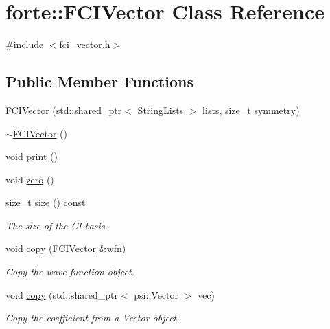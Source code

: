 \hypertarget{classforte_1_1_f_c_i_vector}{}\section{forte\+:\+:F\+C\+I\+Vector Class Reference}
\label{classforte_1_1_f_c_i_vector}


{\ttfamily \#include $<$fci\+\_\+vector.\+h$>$}

\subsection*{Public Member Functions}
\begin{DoxyCompactItemize}
\item 
\mbox{\hyperlink{classforte_1_1_f_c_i_vector_ac11c68d1754586cf203dad0b95a07b86}{F\+C\+I\+Vector}} (std\+::shared\+\_\+ptr$<$ \mbox{\hyperlink{classforte_1_1_string_lists}{String\+Lists}} $>$ lists, size\+\_\+t symmetry)
\item 
\mbox{\hyperlink{classforte_1_1_f_c_i_vector_a84a8cb8bb781300b63f904bea8a38a60}{$\sim$\+F\+C\+I\+Vector}} ()
\item 
void \mbox{\hyperlink{classforte_1_1_f_c_i_vector_aefc1a1762450009031c196c96bae636e}{print}} ()
\item 
void \mbox{\hyperlink{classforte_1_1_f_c_i_vector_abc76153c77025417cebb1a58d5382ae1}{zero}} ()
\item 
size\+\_\+t \mbox{\hyperlink{classforte_1_1_f_c_i_vector_a47e6063b6b07af86a2e6f439bcb2037f}{size}} () const
\begin{DoxyCompactList}\small\item\em The size of the CI basis. \end{DoxyCompactList}\item 
void \mbox{\hyperlink{classforte_1_1_f_c_i_vector_a4c1591f17c9b23b29730a2f1d76c5785}{copy}} (\mbox{\hyperlink{classforte_1_1_f_c_i_vector}{F\+C\+I\+Vector}} \&wfn)
\begin{DoxyCompactList}\small\item\em Copy the wave function object. \end{DoxyCompactList}\item 
void \mbox{\hyperlink{classforte_1_1_f_c_i_vector_a131ea2c22528308ec890b45c9fed78a3}{copy}} (std\+::shared\+\_\+ptr$<$ psi\+::\+Vector $>$ vec)
\begin{DoxyCompactList}\small\item\em Copy the coefficient from a Vector object. \end{DoxyCompactList}\item 

\end{DoxyCompactItemize}
